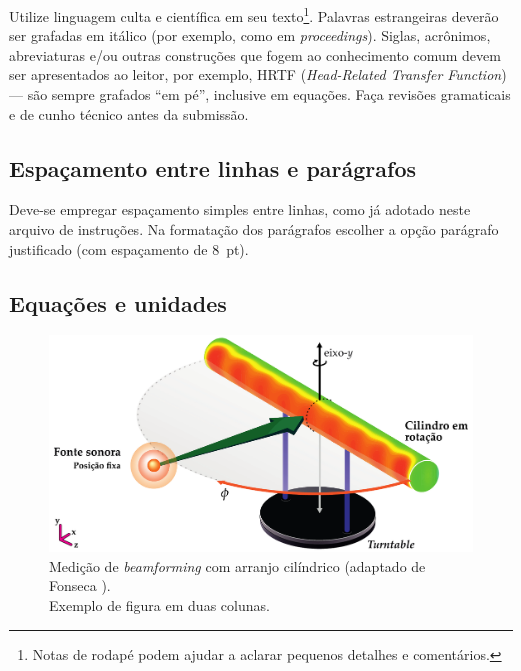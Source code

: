 \documentclass[12pt, a4paper, twoside, twocolumn]{article}
\begin{document}

Utilize linguagem culta e científica em seu texto\footnote{Notas de rodapé podem ajudar a aclarar pequenos detalhes e comentários.}. Palavras estrangeiras deverão ser grafadas em itálico (por exemplo, como em \textit{proceedings}). Siglas, acrônimos, abreviaturas e/ou outras construções que fogem ao conhecimento comum devem ser apresentados ao leitor, por exemplo, HRTF (\textit{Head-Related Transfer Function}) --- são sempre grafados ``em pé'', inclusive em equações.
Faça revisões gramaticais e de cunho técnico antes da submissão.

\subsection{Espaçamento entre linhas e parágrafos}

Deve-se empregar espaçamento simples entre linhas, como já adotado neste arquivo de instruções.
Na formatação dos parágrafos escolher a opção parágrafo justificado (com espaçamento de 8~pt).


\subsection{Equações e unidades}

\begin{figure}[!ht] %
	\centering
	\includegraphics[width=0.72\linewidth]{figs/Measurement-Scheme-Fonseca-2013.pdf}%
	\caption{Medição de \textit{beamforming} com arranjo cilíndrico (adaptado de Fonseca \cite{Fonseca-2013}).\\ Exemplo de figura em duas colunas.}%
	\label{fig:beamforming}%
\end{figure}
\end{document}
